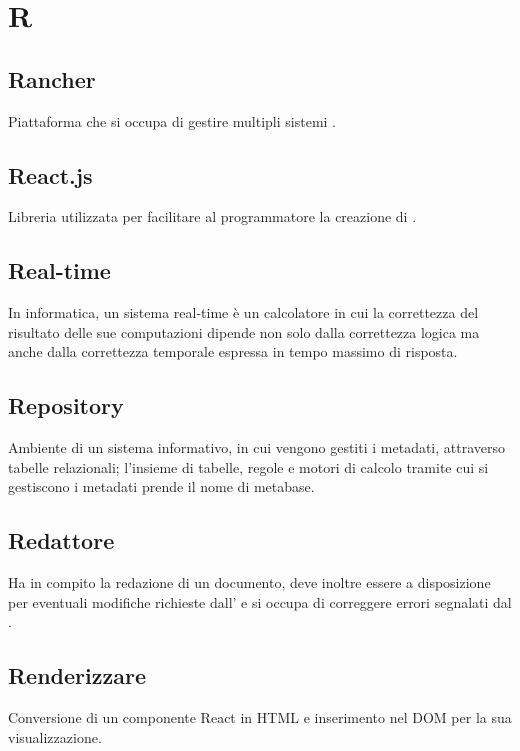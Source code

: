 \section*{R}
\markright{}

\subsection*{Rancher}
Piattaforma che si occupa di gestire multipli sistemi .

\subsection*{React.js}
Libreria  utilizzata per facilitare al programmatore la creazione di .

\subsection*{Real-time}
In informatica, un sistema real-time è un calcolatore in cui la correttezza del risultato delle sue computazioni dipende non solo dalla correttezza logica ma anche dalla correttezza temporale espressa in tempo massimo di risposta.

\subsection*{Repository}
Ambiente di un sistema informativo, in cui vengono gestiti i metadati, attraverso tabelle relazionali; l'insieme di tabelle, regole e motori di calcolo tramite cui si gestiscono i metadati prende il nome di metabase.  

\subsection*{Redattore}
Ha in compito la redazione di un documento, deve inoltre essere a disposizione per eventuali modifiche richieste dall' e si occupa di correggere errori segnalati dal .

\subsection*{Renderizzare}
Conversione di un componente React in HTML e inserimento nel DOM per la sua visualizzazione.